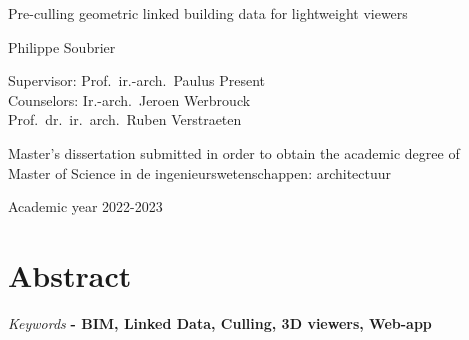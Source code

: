 \begin{center}
    \sffamily
    \huge Pre-culling geometric linked building data
    for lightweight viewers

    \Large Philippe Soubrier

    \normalsize
    Supervisor: Prof.\ ir.-arch.\ Paulus Present         \\
    Counselors: Ir.-arch.\ Jeroen Werbrouck \\
    Prof.\ dr.\ ir.\ arch.\ Ruben Verstraeten
\end{center}

Master’s dissertation submitted in order to obtain the academic degree of \\
Master of Science in de ingenieurswetenschappen: architectuur

Academic year 2022-2023
\section*{\LARGE Abstract}
\lipsum[1-2]

\vfill
\emph{Keywords} \textbf{
    - BIM, Linked Data, Culling, 3D viewers, Web-app
}
\vspace{1cm}